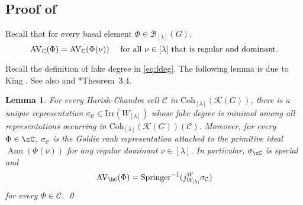 \documentclass[12pt,a4paper]{amsart}
\newcommand{\AVC}{\mathrm{AV}_\bC}
\newcommand{\CC}{{\mathcal {C}}}
\newcommand{\CK}{{\mathcal {K}}}
\DeclareMathOperator{\Ann}{Ann}
\numberwithin{equation}{section}
\newtheorem{lem}[thm]{Lemma}
\theoremstyle{remark}
\def\Irr{\mathrm{Irr}}
\def\WLam{W_{\Lam}}
\def\Coh{\mathrm{Coh}}
\def\Spr{\mathrm{Springer}}
\newcommand{\Lam}{{[\lambda]}}
\begin{document}
\subsection{Proof of }  Recall that for every basal element $\Phi\in \mathcal B_\Lam(G)$,
\[
   \mathrm{AV}_\C(\Phi)= \mathrm{AV}_\C(\Phi(\nu))\quad \textrm{ for all $\nu\in \Lam$ that is regular and dominant}.
\]

Recall the definition of fake degree in \eqref{eq:fdeg}.
The following lemma is due to King \cite{King}. See also \cite[Corollary 14.11]{V4} and \cite{Cas}*{Theorem~3.4}.
\begin{lem}\label{hcgoldie}
  For every Harish-Chandra cell $\CC$ in $\Coh_{[\lambda]}(\CK(G))$, there is a
  unique representation $\sigma_\CC\in \Irr(W_\Lam)$ whose fake degree is
  minimal among all representations occurring in $\Coh_{[\lambda]}(\CK(G))(\CC)$.
  Moreover,
  for every $\Phi\in \cC$, $\sigma_{\CC}$ is the Goldie rank representation
  attached to the primitive ideal $\Ann(\Phi(\nu))$ for any regular dominant
  $\nu \in [\lambda]$.
  In particular, $\sigma_{\cC}$ is special
  and
\[
  \AVC(\Phi)=\Spr^{-1}(j_{W_\Lam}^W \sigma_\CC)
\]
for every $\Phi\in \CC$. \qed
\end{lem}



\end{document}
